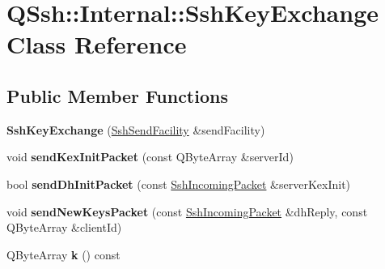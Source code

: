 \hypertarget{class_q_ssh_1_1_internal_1_1_ssh_key_exchange}{}\section{Q\+Ssh\+:\+:Internal\+:\+:Ssh\+Key\+Exchange Class Reference}
\label{class_q_ssh_1_1_internal_1_1_ssh_key_exchange}
\subsection*{Public Member Functions}
\begin{DoxyCompactItemize}
\item 
\mbox{\label{class_q_ssh_1_1_internal_1_1_ssh_key_exchange_a0325f4838892bc9739335a650ea72d37}} 
{\bfseries Ssh\+Key\+Exchange} (\mbox{\hyperlink{class_q_ssh_1_1_internal_1_1_ssh_send_facility}{Ssh\+Send\+Facility}} \&send\+Facility)
\item 
\mbox{\label{class_q_ssh_1_1_internal_1_1_ssh_key_exchange_a3007f5fa434e2828ac4bfe87da6f1030}} 
void {\bfseries send\+Kex\+Init\+Packet} (const Q\+Byte\+Array \&server\+Id)
\item 
\mbox{\label{class_q_ssh_1_1_internal_1_1_ssh_key_exchange_a69ddfac9f244b3c6d197e2844619109b}} 
bool {\bfseries send\+Dh\+Init\+Packet} (const \mbox{\hyperlink{class_q_ssh_1_1_internal_1_1_ssh_incoming_packet}{Ssh\+Incoming\+Packet}} \&server\+Kex\+Init)
\item 
\mbox{\label{class_q_ssh_1_1_internal_1_1_ssh_key_exchange_aa6a737580681d469fbe9b2df0dd552fb}} 
void {\bfseries send\+New\+Keys\+Packet} (const \mbox{\hyperlink{class_q_ssh_1_1_internal_1_1_ssh_incoming_packet}{Ssh\+Incoming\+Packet}} \&dh\+Reply, const Q\+Byte\+Array \&client\+Id)
\item 
\mbox{\label{class_q_ssh_1_1_internal_1_1_ssh_key_exchange_a640fef7fd431677a98057584cb33ba4c}} 
Q\+Byte\+Array {\bfseries k} () const
\item 
\mbox{\label{class_q_ssh_1_1_internal_1_1_ssh_key_exchange_ab15378688078d75681e6972883f01c8a}} 

\end{DoxyCompactItemize}
